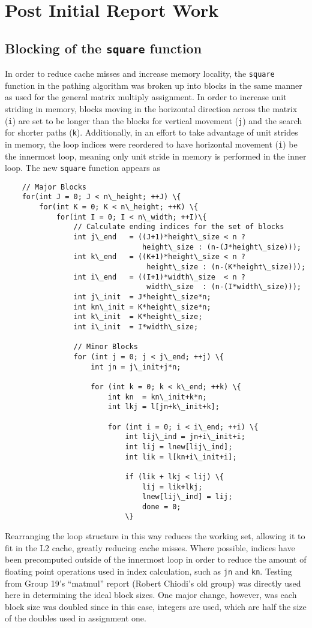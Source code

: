 \documentclass[11pt]{article}
\begin{document}
\section{Post Initial Report Work}
\subsection{Blocking of the \texttt{square} function}
\noindent In order to reduce cache misses and increase memory locality, the \texttt{square} function in the pathing algorithm was broken up into blocks in the same manner as used for the general matrix multiply assignment. In order to increase unit striding in memory, blocks moving in the horizontal direction across the matrix (\texttt{i}) are set to be longer than the blocks for vertical movement (\texttt{j}) and the search for shorter paths (\texttt{k}). Additionally, in an effort to take advantage of unit strides in memory, the loop indices were reordered to have horizontal movement (\texttt{i}) be the innermost loop, meaning only unit stride in memory is performed in the inner loop. The new \texttt{square} function appears as
\begin{lstlisting}
    // Major Blocks
    for(int J = 0; J < n\_height; ++J) \{
	    for(int K = 0; K < n\_height; ++K) \{
		    for(int I = 0; I < n\_width; ++I)\{
			    // Calculate ending indices for the set of blocks
			    int j\_end   = ((J+1)*height\_size < n ? 
							    height\_size : (n-(J*height\_size)));
			    int k\_end   = ((K+1)*height\_size < n ?
							     height\_size : (n-(K*height\_size)));
			    int i\_end   = ((I+1)*width\_size  < n ?
							     width\_size  : (n-(I*width\_size)));
			    int j\_init  = J*height\_size*n;
			    int kn\_init = K*height\_size*n;
			    int k\_init  = K*height\_size;
			    int i\_init  = I*width\_size;
    
			    // Minor Blocks
			    for (int j = 0; j < j\_end; ++j) \{
				    int jn = j\_init+j*n;
    
				    for (int k = 0; k < k\_end; ++k) \{
					    int kn  = kn\_init+k*n;
					    int lkj = l[jn+k\_init+k];
    
					    for (int i = 0; i < i\_end; ++i) \{
						    int lij\_ind = jn+i\_init+i;
						    int lij = lnew[lij\_ind];
						    int lik = l[kn+i\_init+i];
    
						    if (lik + lkj < lij) \{
							    lij = lik+lkj;
							    lnew[lij\_ind] = lij;
							    done = 0;
						    \}
\end{lstlisting}
\noindent Rearranging the loop structure in this way reduces the working set, allowing it to fit in the L2 cache, greatly reducing cache misses. Where possible, indices have been precomputed outside of the innermost loop in order to reduce the amount of floating point operations used in index calculation, such as \texttt{jn} and \texttt{kn}. Testing from Group 19's ``matmul'' report (Robert Chiodi's old group) was directly used here in determining the ideal block sizes. One major change, however, was each block size was doubled since in this case, integers are used, which are half the size of the doubles used in assignment one. \\
\end{document}
